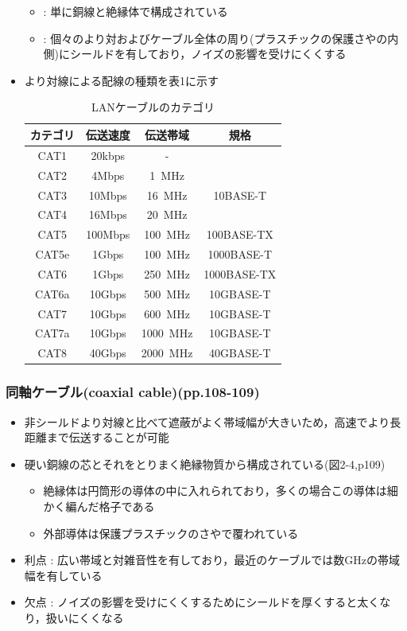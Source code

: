 \documentclass[a4paper]{ltjsarticle}
\begin{document}
\begin{itemize}
\begin{itemize}
					\item {} : 単に銅線と絶縁体で構成されている
					\item {} : 個々のより対およびケーブル全体の周り(プラスチックの保護さやの内側)にシールドを有しており，ノイズの影響を受けにくくする
				\end{itemize}
				\item より対線による配線の種類を表1に示す\cite{lan}
					\begin{table}[H]
						\centering
						\caption{LANケーブルのカテゴリ}
						\begin{tabular}{c|c|c|c}
							カテゴリ & 伝送速度 & 伝送帯域 & 規格 \\ \hline
							CAT1 & 20kbps & - & \\
							CAT2 & 4Mbps & \SI{1}{MHz} & \\
							CAT3 & 10Mbps & \SI{16}{MHz} & 10BASE-T\\
							CAT4 & 16Mbps & \SI{20}{MHz} & \\
							CAT5 & 100Mbps & \SI{100}{MHz} & 100BASE-TX\\
							CAT5e & 1Gbps & \SI{100}{MHz} & 1000BASE-T\\
							CAT6 & 1Gbps & \SI{250}{MHz} & 1000BASE-TX\\
							CAT6a & 10Gbps & \SI{500}{MHz} & 10GBASE-T\\
							CAT7 & 10Gbps & \SI{600}{MHz} & 10GBASE-T\\
							CAT7a & 10Gbps & \SI{1000}{MHz} & 10GBASE-T\\
							CAT8 & 40Gbps & \SI{2000}{MHz} & 40GBASE-T\\
						\end{tabular}
					\end{table}
			\end{itemize}
		\subsubsection{同軸ケーブル(coaxial cable)(pp.108-109)}
			\begin{itemize}
				\item 非シールドより対線と比べて遮蔽がよく帯域幅が大きいため，高速でより長距離まで伝送することが可能
				\item 硬い銅線の芯とそれをとりまく絶縁物質から構成されている(図2-4,p109)
				\begin{itemize}
					\item 絶縁体は円筒形の導体の中に入れられており，多くの場合この導体は細かく編んだ格子である
					\item 外部導体は保護プラスチックのさやで覆われている
				\end{itemize}
				\item 利点 : 広い帯域と対雑音性を有しており，最近のケーブルでは数GHzの帯域幅を有している
				\item 欠点 : ノイズの影響を受けにくくするためにシールドを厚くすると太くなり，扱いにくくなる
			\end{itemize}
\end{document}
